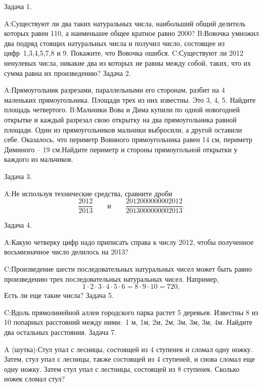\documentclass[11pt,a4paper,book]{ncc} \usepackage{modules/nonstahp_book}
\begin{document}
\bigbreak\noindent
Задача 1.\par\noindent
A:\qquad Существуют ли два таких натуральных числа, наибольший общий делитель которых равен 110, а наименьшее общее кратное равно 2000?
\medbreak\noindent
B:\qquad Вовочка умножил два подряд стоящих натуральных числа и получил число, состоящее из цифр\ 1,3,4,5,7,8 и 9. Покажите, что Вовочка ошибся.
\medbreak\noindent
C:\qquad Существуют ли 2012 ненулевых числа, никакие два из которых не равны между собой, таких, что их сумма равна их произведению?
\bigbreak\noindent
Задача 2.\par\noindent
A:\qquad Прямоугольник разрезами, параллельными его сторонам, разбит на 4 маленьких прямоугольника. Площади трех из них известны. Это 3, 4, 5. Найдите площадь четвертого.
\medbreak\noindent
B:\qquad Мальчики Вова и Дима купили по одной новогодней открытке и каждый разрезал свою открытку на два прямоугольника равной площади. Один из прямоугольников мальчики выбросили, а другой оставили себе. Оказалось, что периметр Вовиного прямоугольника равен 14 см, периметр Диминого -- 19 см.Найдите периметр и стороны прямоугольной открытки у каждого из мальчиков.
\medbreak
\noindent

\bigbreak\noindent
Задача 3.\par\noindent
A:\qquad Не используя технические средства, сравните дроби
$$
\frac{2012}{2013}\qquad\text{и}\qquad\frac{2012000000002012}{2013000000002013}.
$$
\medbreak\noindent

\medbreak\noindent

\bigbreak\noindent
Задача 4.\par\noindent
A:\qquad Какую четверку цифр надо приписать справа к числу 2012, чтобы полученное восьмизначное число делилось на 2013?
\medbreak\noindent

\medbreak\noindent
C:\qquad Произведение шести последовательных натуральных чисел может быть равно произведению трех последовательных натуральных чисел. Например,
$$1\cdot 2\cdot 3\cdot 4\cdot 5\cdot 6=8\cdot 9\cdot 10=720,$$Есть ли еще такие числа?
\bigbreak\noindent
Задача 5.\par\noindent


\medbreak\noindent
C:\qquad Вдоль прямолинейной аллеи городского парка растет 5 деревьев. Известны 8 из 10 попарных расстояний между ними:\ 1 м, 1м, 2м, 2м, 3м, 3м, 3м, 4м. Найдите два остальных расстояния.
\bigbreak\noindent
Задача 7.\par\noindent
A (шутка):\qquad Стул упал с лесницы, состоящей из 4 ступенек и сломал одну ножку. Затем, стул упал с лесницы, также состоящей из 4 ступеней, и снова сломал еще одну ножку. Затем стул упал с лестницы, состоящей из 8 ступенек. Сколько ножек сломал стул?
\end{document}
